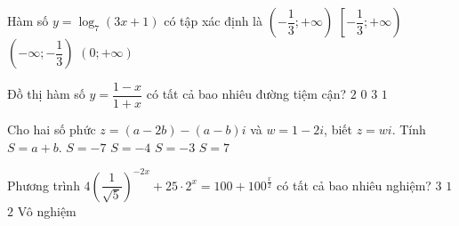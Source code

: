 \begin{ex}%
Hàm số $y=\log_7(3x+1)$ có tập xác định là
\choice
{\True $\left(-\dfrac{1}{3};+\infty\right)$}
{$\left[-\dfrac{1}{3};+\infty\right)$}
{$\left(-\infty;-\dfrac{1}{3}\right)$}
{$(0;+\infty)$}
\end{ex}

\begin{ex}%
Đồ thị hàm số $y=\dfrac{1-x}{1+x}$ có tất cả bao nhiêu đường tiệm cận?
\choice
{\True $2$}
{$0$}
{$3$}
{$1$}
\end{ex}

\begin{ex}%
Cho hai số phức $z=(a-2b)-(a-b)i$ và $w=1-2i$, biết $z=wi$. Tính $S=a+b$.
\choice
{\True $S=-7$}
{$S=-4$}
{$S=-3$}
{$S=7$}
\end{ex}

\begin{ex}%
Phương trình $4\left(\dfrac{1}{\sqrt{5}}\right)^{-2x}+25\cdot 2^x=100+100^{\frac{x}{2}}$ có tất cả bao nhiêu nghiệm?
\choice
{$3$}
{\True $1$}
{$2$}
{Vô nghiệm}
\end{ex}


